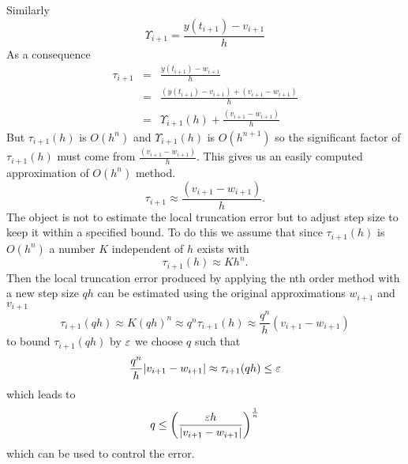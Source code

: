 Similarly
\[ \Upsilon_{i+1} =\frac{y(t_{i+1})-v_{i+1}}{h} \]
As a consequence
\begin{eqnarray*}
\tau_{i+1} &=& \frac{y(t_{i+1})-w_{i+1}}{h} \\
 &=& \frac{(y(t_{i+1})-v_{i+1})+(v_{i+1}-w_{i+1})}{h} \\
 &=& \Upsilon_{i+1}(h)+\frac{(v_{i+1}-w_{i+1})}{h} 
\end{eqnarray*}
But $\tau_{i+1}(h)$ is $O(h^n)$ and $\Upsilon_{i+1}(h)$ is $O(h^{n+1})$ so the 
significant factor of $\tau_{i+1}(h)$ must come from $\frac{(v_{i+1}-w_{i+1})}{h}$.  This gives us an easily computed approximation of $O(h^n)$ method.
\[\tau_{i+1} \approx \frac{(v_{i+1}-w_{i+1})}{h}.  \]
The object is not to estimate the local truncation error but to adjust step size to 
keep it within a specified bound.  To do this we assume that since $\tau_{i+1}(h)$ is $O(h^n)$ a number $K$ independent of $h$ exists with \[\tau_{i+1}(h) \approx Kh^n. \]
Then the local truncation error produced by applying the nth order method with a
new step size $qh$ can be estimated using the original approximations $w_{i+1}$ 
and $v_{i+1}$
\[\tau_{i+1}(qh) \approx K(qh)^n \approx q^n\tau_{i+1}(h) \approx \frac{q^n}{h}(v_{i+1}-w_{i+1}) \]
to bound $\tau_{i+1}(qh)$ by $\varepsilon$ we choose $q$ such that
\[\frac{q^n}{h}|v_{i+1}-w_{i+1}|\approx \tau_{i+1}(qh) \leq \varepsilon \]
which leads to
\[ q \leq \left( \frac{\varepsilon h }{|v_{i+1}-w_{i+1}|}\right)^{\frac{1}{n}} \]
which can be used to control the error.


\newpage
